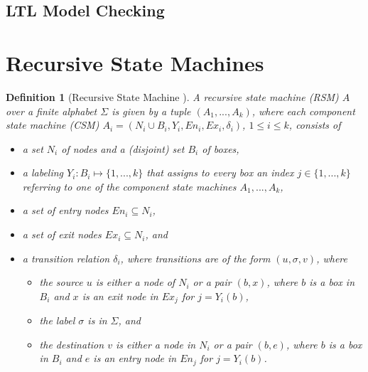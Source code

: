 \documentclass[a4paper, 12pt, twoside]{report}
\theoremstyle{plain}
\newtheorem{definition}[theorem]{Definition}
\begin{document}
	
	
	\subsection{LTL Model Checking}
	
	\section{Recursive State Machines} 
		\begin{definition}[Recursive State Machine \cite{alur2001analysis}]\label{def:rsm}
			A \textup{recursive state machine} (RSM) $A$ over a finite alphabet $\Sigma$ is given by a tuple $(A_1, ..., A_k)$, where each \textup{component state machine} (CSM) $A_i = (N_i \cup B_i, Y_i, En_i, Ex_i, \delta_i)$, $1 \leq i \leq k$, consists of
			\begin{itemize}
				\item a set $N_i$ of \textup{nodes} and a (disjoint) set $B_i$ of \textup{boxes},
				\item a \textup{labeling} $Y_i: B_i \mapsto \{1, ..., k\}$ that assigns to every box an index $j \in \{1, ..., k\}$ referring to one of the component state machines $A_1, ..., A_k$,
				\item a set of \textup{entry nodes} $En_i \subseteq N_i$,
				\item a set of \textup{exit nodes} $Ex_i \subseteq N_i$, and
				\item a \textup{transition relatio}n $\delta_i$, where transitions are of the form $(u, \sigma, v)$, where 
				\begin{itemize}
					\item the source $u$ is either a node of $N_i$ or a pair $(b, x)$, where $b$ is a box in $B_i$ and $x$ is an exit node in $Ex_j$ for $j = Y_i(b)$,
					\item the label $\sigma$ is in $\Sigma$, and 
					\item the destination $v$ is either a node in $N_i$ or a pair $(b, e)$, where $b$ is a box in $B_i$ and $e$ is an entry node in $En_j$ for $j = Y_i(b)$.
				\end{itemize}
			\end{itemize}
		\end{definition}
	
	
\end{document}
